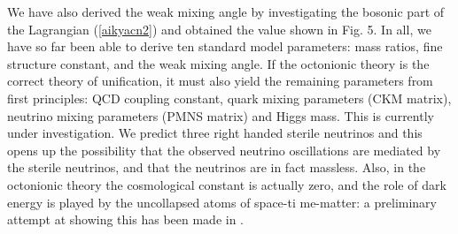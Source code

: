 \documentclass[a4paper]{jpconf}
\begin{document}
We have also derived \cite{Raj} the weak mixing angle by investigating the bosonic part of the Lagrangian (\ref{aikyacn2}) and obtained the value shown in Fig. 5. In all, we have so far been able to derive ten standard model parameters: mass ratios, fine structure constant, and the weak mixing angle. If the octonionic theory is the correct theory of unification, it must also yield the remaining parameters from first principles: QCD coupling constant, quark mixing parameters (CKM matrix), neutrino mixing parameters (PMNS matrix) and Higgs mass. This is currently under investigation. We predict three right handed sterile neutrinos and this opens up the possibility that the observed neutrino oscillations are mediated by the sterile neutrinos, and that the neutrinos are in fact massless. Also, in the octonionic theory the cosmological constant is actually zero, and the role of dark energy is played by the uncollapsed atoms of space-ti me-matter: a preliminary attempt at showing this has been made in \cite{SinghDE}. 
\end{document}
